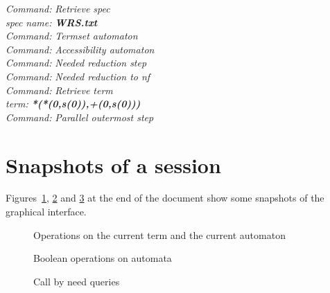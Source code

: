 \documentclass[11pt]{llncs}
\def\autocom#1{\textsl{#1 }}
\def\autocombf#1{{\bf \textsl{#1}}}
\begin{document}
\autocom{Command:} \autocom{Retrieve spec}\\
\autocom{spec name:} \autocombf{WRS.txt}\\
\autocom{Command:} \autocom{Termset automaton}\\
\autocom{Command:} \autocom{Accessibility automaton}\\
\autocom{Command:} \autocom{Needed reduction step}\\
\autocom{Command:} \autocom{Needed reduction to nf}\\
\autocom{Command:} \autocom{Retrieve term}\\
\autocom{term:} \autocombf{ *(*(0,s(0)),+(0,s(0)))}\\
\autocom{Command:} \autocom{Parallel outermost step}\\

\section{Snapshots of a session}
Figures~\ref{figure-sc1}, \ref{figure-sc2} and \ref{figure-sc3} at the
end of the document show some snapshots of the graphical interface.
\begin{figure}[ht]
\caption{Operations on the current term and the current automaton}
\label{figure-sc1}
\end{figure}
\begin{figure}[ht]
\caption{Boolean operations on automata}
\label{figure-sc2}
\end{figure}
\begin{figure}[ht]
\caption{Call by need queries}
\label{figure-sc3}
\end{figure}


\end{document}
